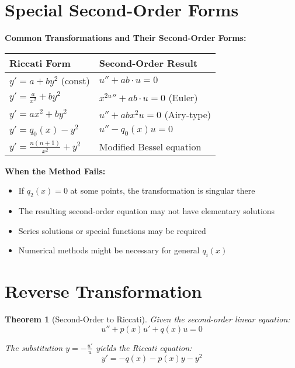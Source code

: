 \documentclass[12pt]{article}
\newtheorem{theorem}{Theorem}
\begin{document}
\section{Special Second-Order Forms}

\begin{keypoint}
\textbf{Common Transformations and Their Second-Order Forms:}
\begin{center}
\begin{tabular}{|l|l|}
\hline
\textbf{Riccati Form} & \textbf{Second-Order Result} \\
\hline
$y' = a + by^{2}$ (const) & $u'' + ab \cdot u = 0$ \\
$y' = \frac{a}{x^{2}} + by^{2}$ & $x^{2u}'' + ab \cdot u = 0$ (Euler) \\
$y' = ax^{2} + by^{2}$ & $u'' + abx^{2} u = 0$ (Airy-type) \\
$y' = q_{0}(x) - y^{2}$ & $u'' - q_{0}(x)u = 0$ \\
$y' = \frac{n(n+1)}{x^{2}} + y^{2}$ & Modified Bessel equation \\
\hline
\end{tabular}
\end{center}
\end{keypoint}

\begin{warning}
\textbf{When the Method Fails:}
\begin{itemize}
    \item If $q_{2}(x) = 0$ at some points, the transformation is singular there
    \item The resulting second-order equation may not have elementary solutions
    \item Series solutions or special functions may be required
    \item Numerical methods might be necessary for general $q_{i}(x)$
\end{itemize}
\end{warning}

\section{Reverse Transformation}

\begin{theorem}[Second-Order to Riccati]
Given the second-order linear equation:
$$u'' + p(x)u' + q(x)u = 0$$

The substitution $y = -\frac{u'}{u}$ yields the Riccati equation:
$$y' = -q(x) - p(x)y - y^{2}$$
\end{theorem}
\end{document}
